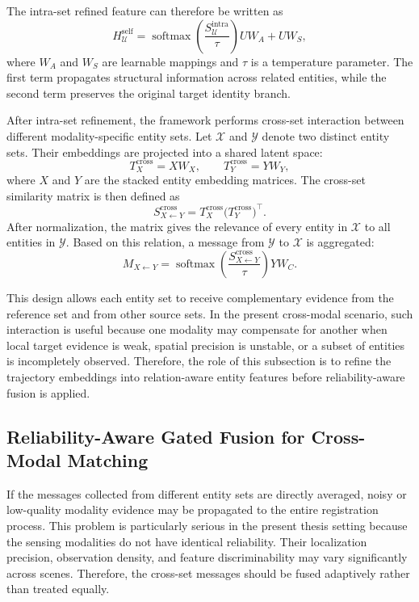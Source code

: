 The intra-set refined feature can therefore be written as
\begin{equation}
  H^{\mathrm{self}}_{\mathcal{U}} =
  \operatorname{softmax}\!\left(\frac{S^{\mathrm{intra}}_{\mathcal{U}}}{\tau}\right) U W_A + U W_S,
\end{equation}
where \(W_A\) and \(W_S\) are learnable mappings and \(\tau\) is a temperature parameter. The first term propagates structural information across related entities, while the second term preserves the original target identity branch.

After intra-set refinement, the framework performs cross-set interaction between different modality-specific entity sets. Let \(\mathcal{X}\) and \(\mathcal{Y}\) denote two distinct entity sets. Their embeddings are projected into a shared latent space:
\begin{equation}
  T^{\mathrm{cross}}_X = XW_X, \qquad T^{\mathrm{cross}}_Y = YW_Y,
\end{equation}
where \(X\) and \(Y\) are the stacked entity embedding matrices. The cross-set similarity matrix is then defined as
\begin{equation}
  S_{X \leftarrow Y}^{\mathrm{cross}} = T^{\mathrm{cross}}_X \big(T^{\mathrm{cross}}_Y\big)^\top.
\end{equation}
After normalization, the matrix gives the relevance of every entity in \(\mathcal{X}\) to all entities in \(\mathcal{Y}\). Based on this relation, a message from \(\mathcal{Y}\) to \(\mathcal{X}\) is aggregated:
\begin{equation}
  M_{X \leftarrow Y} =
  \operatorname{softmax}\!\left(\frac{S_{X \leftarrow Y}^{\mathrm{cross}}}{\tau}\right) YW_C.
\end{equation}

This design allows each entity set to receive complementary evidence from the reference set and from other source sets. In the present cross-modal scenario, such interaction is useful because one modality may compensate for another when local target evidence is weak, spatial precision is unstable, or a subset of entities is incompletely observed. Therefore, the role of this subsection is to refine the trajectory embeddings into relation-aware entity features before reliability-aware fusion is applied.

\subsection{Reliability-Aware Gated Fusion for Cross-Modal Matching}
If the messages collected from different entity sets are directly averaged, noisy or low-quality modality evidence may be propagated to the entire registration process. This problem is particularly serious in the present thesis setting because the sensing modalities do not have identical reliability. Their localization precision, observation density, and feature discriminability may vary significantly across scenes. Therefore, the cross-set messages should be fused adaptively rather than treated equally.

